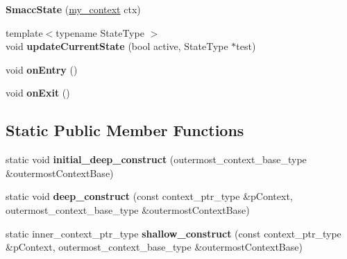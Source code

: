 \begin{DoxyCompactItemize}
\item 
\hypertarget{classsmacc_1_1SmaccState_adc225018fe91da47e6e9f1d20150b26a}{{\bfseries Smacc\-State} (\hyperlink{structsmacc_1_1SmaccState_1_1my__context}{my\-\_\-context} ctx)}\label{classsmacc_1_1SmaccState_adc225018fe91da47e6e9f1d20150b26a}

\item 
\hypertarget{classsmacc_1_1SmaccState_abc2a2b5e635b0ba09fcb350710b20117}{{\footnotesize template$<$typename State\-Type $>$ }\\void {\bfseries update\-Current\-State} (bool active, State\-Type $\ast$test)}\label{classsmacc_1_1SmaccState_abc2a2b5e635b0ba09fcb350710b20117}

\item 
\hypertarget{classsmacc_1_1SmaccState_a4a10a74fdbe51a798b8d651668b8ed9a}{void {\bfseries on\-Entry} ()}\label{classsmacc_1_1SmaccState_a4a10a74fdbe51a798b8d651668b8ed9a}

\item 
\hypertarget{classsmacc_1_1SmaccState_a82ca7c69153e86dc5eedf3f909560f3a}{void {\bfseries on\-Exit} ()}\label{classsmacc_1_1SmaccState_a82ca7c69153e86dc5eedf3f909560f3a}

\end{DoxyCompactItemize}
\subsection*{Static Public Member Functions}
\begin{DoxyCompactItemize}
\item 
\hypertarget{classsmacc_1_1SmaccState_af4b4635d16a32bdd3956e5d40ddbd01d}{static void {\bfseries initial\-\_\-deep\-\_\-construct} (outermost\-\_\-context\-\_\-base\-\_\-type \&outermost\-Context\-Base)}\label{classsmacc_1_1SmaccState_af4b4635d16a32bdd3956e5d40ddbd01d}

\item 
\hypertarget{classsmacc_1_1SmaccState_aac23d8a6909f75c5e5fca2a7c09b5368}{static void {\bfseries deep\-\_\-construct} (const context\-\_\-ptr\-\_\-type \&p\-Context, outermost\-\_\-context\-\_\-base\-\_\-type \&outermost\-Context\-Base)}\label{classsmacc_1_1SmaccState_aac23d8a6909f75c5e5fca2a7c09b5368}

\item 
\hypertarget{classsmacc_1_1SmaccState_a1dccb401e1a99031863a21a590d953e6}{static inner\-\_\-context\-\_\-ptr\-\_\-type {\bfseries shallow\-\_\-construct} (const context\-\_\-ptr\-\_\-type \&p\-Context, outermost\-\_\-context\-\_\-base\-\_\-type \&outermost\-Context\-Base)}\label{classsmacc_1_1SmaccState_a1dccb401e1a99031863a21a590d953e6}

\end{DoxyCompactItemize}
